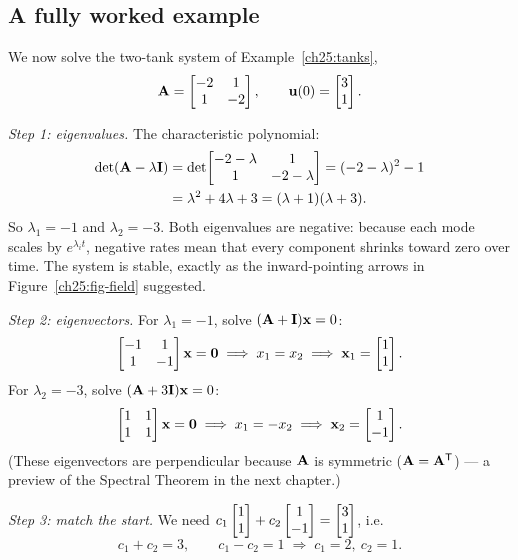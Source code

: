 \subsection{A fully worked example}
\label{ch25:tanks-solved}

We now solve the two-tank system of Example~\ref{ch25:tanks},
\[
  \mathbf{A} = \begin{bmatrix} -2 & 1 \\ 1 & -2 \end{bmatrix},
  \qquad
  \mathbf{u}(0) = \begin{bmatrix}3\\1\end{bmatrix}.
\]

\emph{Step 1: eigenvalues.} The characteristic polynomial:
\begin{align*}
  \det(\mathbf{A}-\lambda\mathbf{I})
  &= \det\!\begin{bmatrix} -2-\lambda & 1 \\ 1 & -2-\lambda \end{bmatrix}
   = (-2-\lambda)^2 - 1\\
  &= \lambda^2 + 4\lambda + 3
   = (\lambda+1)(\lambda+3).
\end{align*}
So $\lambda_1 = -1$ and $\lambda_2 = -3$. Both eigenvalues are negative: because
each mode scales by $e^{\lambda_i t}$, negative rates mean that every component
shrinks toward zero over time. The system is stable, exactly as the inward-pointing
arrows in Figure~\ref{ch25:fig-field} suggested.

\emph{Step 2: eigenvectors.} For $\lambda_1=-1$, solve $(\mathbf{A}+\mathbf{I})\mathbf{x}=0$:
\[
  \begin{bmatrix} -1 & 1 \\ 1 & -1 \end{bmatrix}\mathbf{x} = \mathbf{0}
  \;\Longrightarrow\; x_1 = x_2
  \;\Longrightarrow\; \mathbf{x}_1 = \begin{bmatrix}1\\1\end{bmatrix}.
\]
For $\lambda_2=-3$, solve $(\mathbf{A}+3\mathbf{I})\mathbf{x}=0$:
\[
  \begin{bmatrix} 1 & 1 \\ 1 & 1 \end{bmatrix}\mathbf{x} = \mathbf{0}
  \;\Longrightarrow\; x_1 = -x_2
  \;\Longrightarrow\; \mathbf{x}_2 = \begin{bmatrix}1\\-1\end{bmatrix}.
\]
(These eigenvectors are perpendicular because $\mathbf{A}$ is symmetric ($\mathbf{A}=\mathbf{A}^{\mathsf{T}}$) ---
a preview of the Spectral Theorem in the next chapter.)

\emph{Step 3: match the start.} We need $c_1\begin{bmatrix}1\\1\end{bmatrix} + c_2\begin{bmatrix}1\\-1\end{bmatrix} =
\begin{bmatrix}3\\1\end{bmatrix}$, i.e.
\[
  c_1 + c_2 = 3, \qquad c_1 - c_2 = 1
  \;\Longrightarrow\; c_1 = 2,\ c_2 = 1.
\]

